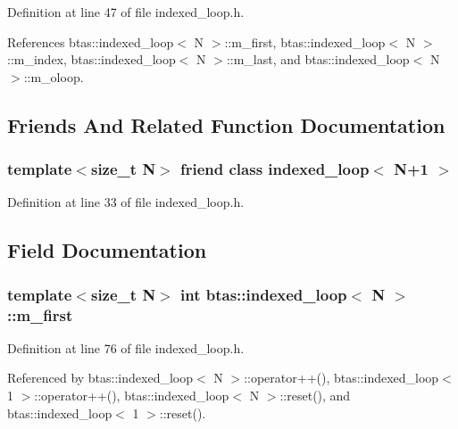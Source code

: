 Definition at line 47 of file indexed\-\_\-loop.\-h.



References btas\-::indexed\-\_\-loop$<$ N $>$\-::m\-\_\-first, btas\-::indexed\-\_\-loop$<$ N $>$\-::m\-\_\-index, btas\-::indexed\-\_\-loop$<$ N $>$\-::m\-\_\-last, and btas\-::indexed\-\_\-loop$<$ N $>$\-::m\-\_\-oloop.



\subsection{Friends And Related Function Documentation}
\subsubsection[{indexed\-\_\-loop$<$ N+1 $>$}]{\setlength{\rightskip}{0pt plus 5cm}template$<$size\-\_\-t N$>$ friend class {\bf indexed\-\_\-loop}$<$ N+1 $>$\hspace{0.3cm}{\ttfamily [friend]}}\label{d4/d84/classbtas_1_1indexed__loop_aab14324e199b0a7abda57cd40e214f8a}


Definition at line 33 of file indexed\-\_\-loop.\-h.



\subsection{Field Documentation}
\subsubsection[{m\-\_\-first}]{\setlength{\rightskip}{0pt plus 5cm}template$<$size\-\_\-t N$>$ int {\bf btas\-::indexed\-\_\-loop}$<$ N $>$\-::m\-\_\-first\hspace{0.3cm}{\ttfamily [private]}}\label{d4/d84/classbtas_1_1indexed__loop_a83e9fc43c8d7f22adcec5869e05ecdd0}


Definition at line 76 of file indexed\-\_\-loop.\-h.



Referenced by btas\-::indexed\-\_\-loop$<$ N $>$\-::operator++(), btas\-::indexed\-\_\-loop$<$ 1 $>$\-::operator++(), btas\-::indexed\-\_\-loop$<$ N $>$\-::reset(), and btas\-::indexed\-\_\-loop$<$ 1 $>$\-::reset().

